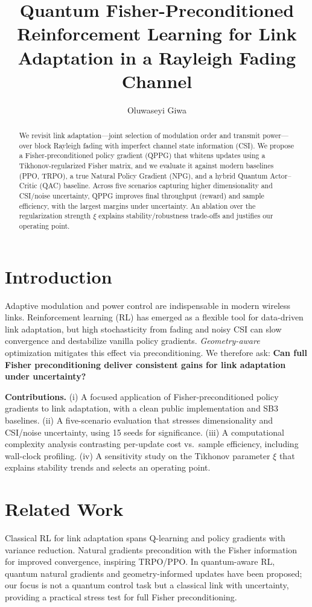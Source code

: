 \documentclass[10pt,conference]{IEEEtran}
\title{Quantum Fisher-Preconditioned Reinforcement Learning for Link Adaptation in a Rayleigh Fading Channel}
\author{Oluwaseyi Giwa}
\begin{document}
\maketitle

\begin{abstract}
We revisit link adaptation---joint selection of modulation order and transmit power---over block Rayleigh fading with imperfect channel state information (CSI). We propose a Fisher-preconditioned policy gradient (QPPG) that whitens updates using a Tikhonov-regularized Fisher matrix, and we evaluate it against modern baselines (PPO, TRPO), a true Natural Policy Gradient (NPG), and a hybrid Quantum Actor--Critic (QAC) baseline. Across five scenarios capturing higher dimensionality and CSI/noise uncertainty, QPPG improves final throughput (reward) and sample efficiency, with the largest margins under uncertainty. An ablation over the regularization strength $\xi$ explains stability/robustness trade-offs and justifies our operating point.
\end{abstract}

\section{Introduction}
Adaptive modulation and power control are indispensable in modern wireless links. Reinforcement learning (RL) has emerged as a flexible tool for data-driven link adaptation, but high stochasticity from fading and noisy CSI can slow convergence and destabilize vanilla policy gradients. \emph{Geometry-aware} optimization mitigates this effect via preconditioning. We therefore ask: \textbf{Can full Fisher preconditioning deliver consistent gains for link adaptation under uncertainty?}

\textbf{Contributions.} (i) A focused application of Fisher-preconditioned policy gradients to link adaptation, with a clean public implementation and SB3 baselines. (ii) A five-scenario evaluation that stresses dimensionality and CSI/noise uncertainty, using 15 seeds for significance. (iii) A computational complexity analysis contrasting per-update cost vs.\ sample efficiency, including wall-clock profiling. (iv) A sensitivity study on the Tikhonov parameter $\xi$ that explains stability trends and selects an operating point.

\section{Related Work}
Classical RL for link adaptation spans Q-learning and policy gradients with variance reduction. Natural gradients precondition with the Fisher information for improved convergence, inspiring TRPO/PPO. In quantum-aware RL, quantum natural gradients and geometry-informed updates have been proposed; our focus is not a quantum control task but a classical link with uncertainty, providing a practical stress test for full Fisher preconditioning.
\end{document}
